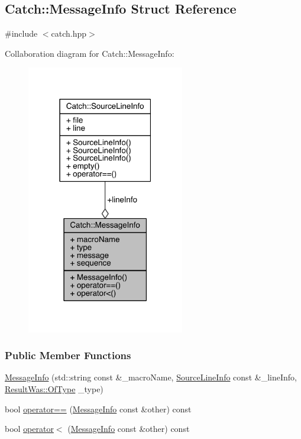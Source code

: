 \hypertarget{a00050}{}\subsection{Catch\+:\+:Message\+Info Struct Reference}
\label{a00050}


{\ttfamily \#include $<$catch.\+hpp$>$}



Collaboration diagram for Catch\+:\+:Message\+Info\+:\nopagebreak
\begin{figure}[H]
\begin{center}
\leavevmode
\includegraphics[width=195pt]{a00230}
\end{center}
\end{figure}
\subsubsection*{Public Member Functions}
\begin{DoxyCompactItemize}
\item 
\hyperlink{a00050_a2e336c33ebef7af3c1bbae6a56e14f8a}{Message\+Info} (std\+::string const \&\+\_\+macro\+Name, \hyperlink{a00075}{Source\+Line\+Info} const \&\+\_\+line\+Info, \hyperlink{a00069_a624e1ee3661fcf6094ceef1f654601ef}{Result\+Was\+::\+Of\+Type} \+\_\+type)
\item 
bool \hyperlink{a00050_a30fe117138e568c5a9dfdabb7de6e790}{operator==} (\hyperlink{a00050}{Message\+Info} const \&other) const 
\item 
bool \hyperlink{a00050_a7a2b1ec3772cd35176e2ee25a94be16a}{operator$<$} (\hyperlink{a00050}{Message\+Info} const \&other) const 
\end{DoxyCompactItemize}
